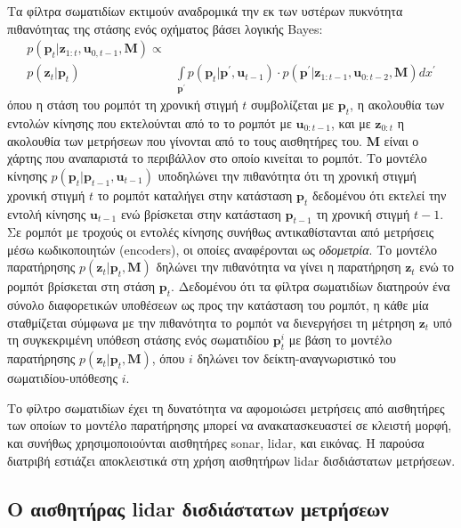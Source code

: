 Τα φίλτρα σωματιδίων εκτιμούν αναδρομικά την εκ των υστέρων πυκνότητα
πιθανότητας της στάσης ενός οχήματος βάσει λογικής Bayes:
\begin{align}
  \label{eq:pf_posterior}
  p(\bm{p}_t | \bm{z}_{1:t}, \bm{u}_{0,t-1}, \bm{M}) \propto & \nonumber \\
    p(\bm{z}_t | \bm{p}_t) &\int\limits_{\bm{p}^{\prime}} p(\bm{p}_t | \bm{p}^{\prime}, \bm{u}_{t-1}) \cdot p(\bm{p}^{\prime} | \bm{z}_{1:t-1}, \bm{u}_{0:t-2}, \bm{M}) dx^{\prime}
\end{align}
όπου η στάση του ρομπότ τη χρονική στιγμή $t$ συμβολίζεται με $\bm{p}_t$, η
ακολουθία των εντολών κίνησης που εκτελούνται από το το ρομπότ με
$\bm{u}_{0:t-1}$, και με $\bm{z}_{0:t}$ η ακολουθία των μετρήσεων που
γίνονται από το τους αισθητήρες του. $\bm{M}$ είναι ο χάρτης που αναπαριστά το
περιβάλλον στο οποίο κινείται το ρομπότ. Το μοντέλο κίνησης $p(\bm{p}_t |
\bm{p}_{t-1}, \bm{u}_{t-1})$ υποδηλώνει την πιθανότητα ότι τη χρονική στιγμή
χρονική στιγμή $t$ το ρομπότ καταλήγει στην κατάσταση $\bm{p}_t$ δεδομένου ότι
εκτελεί την εντολή κίνησης $\bm{u}_{t-1}$ ενώ βρίσκεται στην κατάσταση
$\bm{p}_{t-1}$ τη χρονική στιγμή $t-1$. Σε ρομπότ με τροχούς οι εντολές
κίνησης συνήθως αντικαθίστανται από μετρήσεις μέσω κωδικοποιητών (encoders), οι
οποίες αναφέρονται ως \textit{οδομετρία}. Το μοντέλο παρατήρησης $p(\bm{z}_t |
\bm{p}_t, \bm{M})$ δηλώνει την πιθανότητα να γίνει η παρατήρηση $\bm{z}_t$ ενώ
το ρομπότ βρίσκεται στη στάση $\bm{p}_t$. Δεδομένου ότι τα φίλτρα σωματιδίων
διατηρούν ένα σύνολο διαφορετικών υποθέσεων ως προς την κατάσταση του ρομπότ, η
κάθε μία σταθμίζεται σύμφωνα με την πιθανότητα το ρομπότ να διενεργήσει τη
μέτρηση $\bm{z}_t$ υπό τη συγκεκριμένη υπόθεση στάσης ενός σωματιδίου
$\bm{p}_t^i$ με βάση το μοντέλο παρατήρησης $p(\bm{z}_t | \bm{p}_t, \bm{M})$,
όπου $i$ δηλώνει τον δείκτη-αναγνωριστικό του σωματιδίου-υπόθεσης $i$.

Το φίλτρο σωματιδίων έχει τη δυνατότητα να αφομοιώσει μετρήσεις από αισθητήρες
των οποίων το μοντέλο παρατήρησης μπορεί να ανακατασκευαστεί σε κλειστή μορφή,
και συνήθως χρησιμοποιούνται αισθητήρες sonar, lidar, και εικόνας. Η παρούσα
διατριβή εστιάζει αποκλειστικά στη χρήση αισθητήρων lidar δισδιάστατων
μετρήσεων.


\subsection{Ο αισθητήρας lidar δισδιάστατων μετρήσεων}

